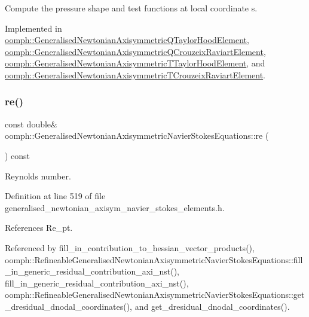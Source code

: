 Compute the pressure shape and test functions at local coordinate s. 



Implemented in \hyperlink{classoomph_1_1GeneralisedNewtonianAxisymmetricQTaylorHoodElement_a1a4c61c01154cc2e95da02ba03495b44}{oomph\+::\+Generalised\+Newtonian\+Axisymmetric\+Q\+Taylor\+Hood\+Element}, \hyperlink{classoomph_1_1GeneralisedNewtonianAxisymmetricQCrouzeixRaviartElement_aecfd9564c4afe408d610c7426c47ccf1}{oomph\+::\+Generalised\+Newtonian\+Axisymmetric\+Q\+Crouzeix\+Raviart\+Element}, \hyperlink{classoomph_1_1GeneralisedNewtonianAxisymmetricTTaylorHoodElement_aa94bc4ba026490b08ff70059c2362a2b}{oomph\+::\+Generalised\+Newtonian\+Axisymmetric\+T\+Taylor\+Hood\+Element}, and \hyperlink{classoomph_1_1GeneralisedNewtonianAxisymmetricTCrouzeixRaviartElement_a5b3ab448ee65204076afc4009bd53f59}{oomph\+::\+Generalised\+Newtonian\+Axisymmetric\+T\+Crouzeix\+Raviart\+Element}.

\mbox{\label{classoomph_1_1GeneralisedNewtonianAxisymmetricNavierStokesEquations_a70c3b671d2cefa468648267556261a7b}} 
\subsubsection{\texorpdfstring{re()}{re()}}
{\footnotesize\ttfamily const double\& oomph\+::\+Generalised\+Newtonian\+Axisymmetric\+Navier\+Stokes\+Equations\+::re (\begin{DoxyParamCaption}{ }\end{DoxyParamCaption}) const\hspace{0.3cm}{\ttfamily [inline]}}



Reynolds number. 



Definition at line 519 of file generalised\+\_\+newtonian\+\_\+axisym\+\_\+navier\+\_\+stokes\+\_\+elements.\+h.



References Re\+\_\+pt.



Referenced by fill\+\_\+in\+\_\+contribution\+\_\+to\+\_\+hessian\+\_\+vector\+\_\+products(), oomph\+::\+Refineable\+Generalised\+Newtonian\+Axisymmetric\+Navier\+Stokes\+Equations\+::fill\+\_\+in\+\_\+generic\+\_\+residual\+\_\+contribution\+\_\+axi\+\_\+nst(), fill\+\_\+in\+\_\+generic\+\_\+residual\+\_\+contribution\+\_\+axi\+\_\+nst(), oomph\+::\+Refineable\+Generalised\+Newtonian\+Axisymmetric\+Navier\+Stokes\+Equations\+::get\+\_\+dresidual\+\_\+dnodal\+\_\+coordinates(), and get\+\_\+dresidual\+\_\+dnodal\+\_\+coordinates().

